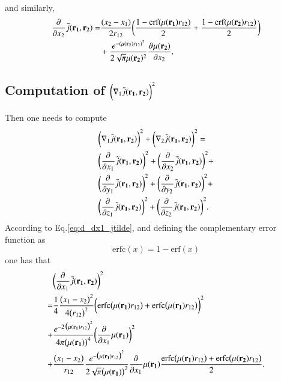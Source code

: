 \documentclass[aip,jcp,reprint,noshowkeys,superscriptaddress]{revtex4-1}
\newcommand{\deriv}[3]{\frac{\partial^{#3} #1}{\partial {#2}^{#3}}}
\newcommand{\bd}[1]{{\bf {#1}}}
\newcommand{\mur}[1]{\mu({\bf r_{#1}})}
\begin{document}
and similarly,
\begin{equation}
 \label{eq:d_dx2_jtilde}
 \begin{aligned}
 \deriv{}{x_2}{} \tilde{j}(\bd{r_1},\bd{r_2}) = & \frac{(x_2 - x_1)}{2 r_{12}} 
 \bigg( \frac{1 - \text{erf}(\mur{1} r_{12})}{2} + \frac{1 - \text{erf}(\mur{2} r_{12})}{2}  \bigg) \\
                 & + \frac{e^{-(\mur{2} r_{12})^2}}{2\sqrt{\pi} \mur{2}^2} \deriv{\mur{2}}{x_2}{},
 \end{aligned}
\end{equation}

\subsection{Computation of $\bigg(\nabla_1\tilde{j}(\bd{r_1},\bd{r_2})\bigg)^2$}
Then one needs to compute 
\begin{equation}
 \begin{aligned}
& \bigg(\nabla_1\tilde{j}(\bd{r_1},\bd{r_2})\bigg)^2 + \bigg(\nabla_2\tilde{j}(\bd{r_1},\bd{r_2})\bigg)^2 = \\
& \bigg(\deriv{}{x_1}{}\tilde{j}(\bd{r_1},\bd{r_2}) \bigg)^2 + \bigg(\deriv{}{x_2}{}\tilde{j}(\bd{r_1},\bd{r_2}) \bigg)^2 +  \\
& \bigg(\deriv{}{y_1}{}\tilde{j}(\bd{r_1},\bd{r_2}) \bigg)^2 + \bigg(\deriv{}{y_2}{}\tilde{j}(\bd{r_1},\bd{r_2}) \bigg)^2 +  \\
& \bigg(\deriv{}{z_1}{}\tilde{j}(\bd{r_1},\bd{r_2}) \bigg)^2 + \bigg(\deriv{}{z_2}{}\tilde{j}(\bd{r_1},\bd{r_2}) \bigg)^2.
 \end{aligned}
\end{equation}
According to Eq.\eqref{eq:d_dx1_jtilde}, 
and defining the complementary error function as 
\begin{equation}
 \text{erfc}(x) = 1 - \text{erf}(x)
\end{equation}
one has that 
\begin{equation}
 \begin{aligned}
& \bigg(\deriv{}{x_1}{}\tilde{j}(\bd{r_1},\bd{r_2}) \bigg)^2  \\
 = & \frac{1}{4}\frac{\big( x_1 - x_2 \big)^2}{4 \big(r_{12}\big)^2} \bigg(\text{erfc}\big(\mur{1} r_{12}\big) + \text{erfc}\big(\mur{1} r_{12}\big) \bigg)^2  \\
 + & \frac{e^{-2 \,\big(\mur{1}r_{12} \big)^2}}{4\pi \big(\mur{1}\big)^4} \bigg( \deriv{}{x_1}{}\mur{1} \bigg)^2 \\
 + & \frac{\big(x_1 - x_2\big)}{r_{12}} \frac{e^{-\big(\mur{1} r_{12}\big)^2}}{2\sqrt{\pi} \big(\mur{1}\big)^2} \deriv{}{x_1}{}\mur{1} 
 \frac{\text{erfc}\big(\mur{1} r_{12}\big) + \text{erfc}\big(\mur{2} r_{12}\big)}{2}.
 \end{aligned}
\end{equation}
\end{document}
